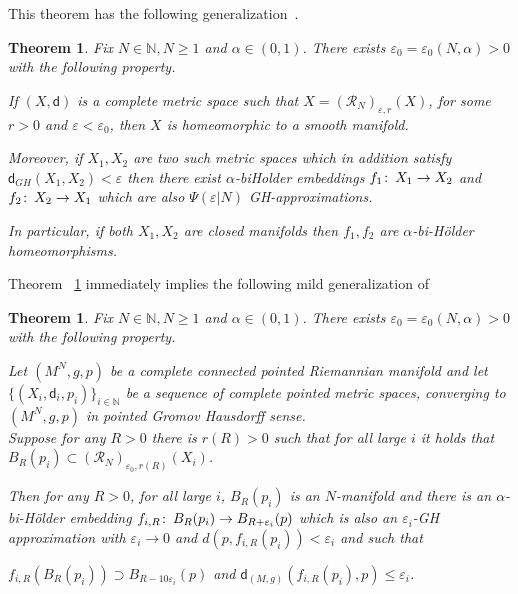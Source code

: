 \documentclass[a4paper]{amsart}
\theoremstyle{plain}
\newtheorem{theorem}[lemma]{Theorem}
\theoremstyle{definition}
\numberwithin{equation}{section}
\newcommand{\N}{\mathbb{N}}
\newcommand{\sfd}{\mathsf d}
\newcommand{\cR}{\mathcal{R}}
\newcommand{\eps}{\varepsilon}
\def\co{\colon\thinspace}
\begin{document}
{This theorem has the following generalization~\cite[Theorems A.1.2, A.1.3]{CC97}. 


\begin{theorem}\label{reifenberg-stab}
Fix $N\in \N, N\geq 1$ and $\alpha\in (0,1)$.
There exists $\eps_0=\eps_0(N,\alpha)>0$ with the following property.

 If $(X,\sfd)$ is a complete metric space such that $X= (\cR_{N})_{\varepsilon, r}(X)$, for some $r>0$ and $\eps<\eps_0$, then $X$ is homeomorphic to a  {smooth} manifold.
 
 Moreover, if $X_1, X_2$ are two such metric spaces which in addition satisfy $\sfd_{GH}(X_1,X_2)<\eps$ then there exist  $\alpha$-biHolder embeddings $f_1\co X_1\to X_2$ and
 $f_2\co X_2\to X_1$ which are also $\Psi(\eps|N)$ GH-approximations.
 
 In particular, if both $X_1,X_2$ are closed manifolds then $f_1,f_2$ are $\alpha$-bi-H\"older homeomorphisms.
\end{theorem}

Theorem ~\ref{reifenberg-stab} immediately implies the following mild generalization of \cite[Theorem A.1.3]{CC97}

\begin{theorem}\label{reifenberg-stab-pointed}
Fix $N\in \N, N\geq 1$ and $\alpha\in (0,1)$.
There exists $\eps_0=\eps_0(N,\alpha)>0$ with the following property.

Let $(M^N,g,p)$ be a complete connected pointed  Riemannian manifold and let $\{(X_{i}, \sfd_{i}, p_{i})\}_{i\in \N}$ be a sequence of complete pointed  metric spaces, converging to $(M^N,g,p)$ in pointed Gromov Hausdorff sense.  
\\Suppose for any $R>0$ there is $r(R)>0$ such that for all large $i$ it holds that  $B_R(p_i)\subset (\cR_{N})_{\varepsilon_{0}, r(R)}(X_i)$.


Then for any $R>0$, for all large $i$, $B_R(p_i)$ is an $N$-manifold and  there is an $\alpha$-bi-H\"older  embedding $f_{i,R}\co B_{R}(p_i)\to B_{R+\eps_i}(p)$ which is also an $\eps_i$-GH approximation with $\eps_i\to 0$ and $d(p, f_{i,R}(p_i))<\eps_i$ and  such that

$f_{i,R}(B_R(p_i))\supset B_{R-10 \eps_i}(p)$ and $\sfd_{(M,g)}(f_{i,R}(p_i),p)\le \eps_i$.


\end{theorem}}
\end{document}
